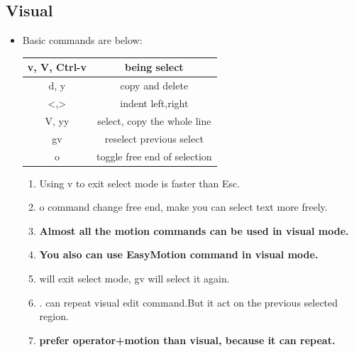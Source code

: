 \documentclass[a4paper,11pt,twoside]{book}
\begin{document}
\subsection{Visual}
\begin{itemize} 
		\item Basic commands are below:
		\begin{center}
				\begin{tabular}{c|c}
						\hline
						v, V, Ctrl-v  & being select\\

						\hline 
						d, y & copy and delete\\

						\hline
						<,> & indent left,right\\

						\hline
						V, yy & select, copy the whole line  \\

						\hline
						gv & reselect previous select \\
						
						\hline 
						o & toggle free end of selection \\

						\hline 		
				\end{tabular}
		\end{center}

	\begin{enumerate}
			\item Using v to exit select mode is faster than Esc. 

			\item o command change free end, make you can select text more freely.

			\item \textbf{Almost all the motion commands can be used in visual mode.}

			\item \textbf{You also can use EasyMotion command in visual mode.}
					
			\item <,> will exit select mode, gv will select it again. 

			\item . can repeat visual edit command.But it act on the previous selected region.  
					
			\item \textbf{prefer operator+motion than visual, because it can repeat.}
	\end{enumerate}					

	\end{itemize}
\end{document}
